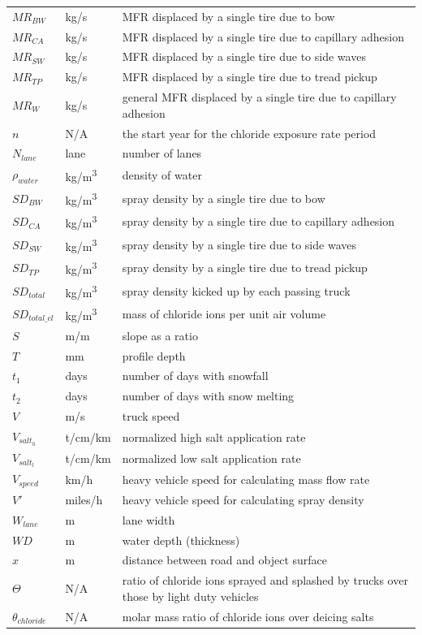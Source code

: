 \documentclass[12pt]{article}
\begin{document}
\begin{longtable*}{l l p{12cm}}
$\mathit{MR_{BW}}$ & \si{kg/s} & MFR displaced by a single tire due to bow\\
$\mathit{MR_{CA}}$ & \si{kg/s} & MFR displaced by a single tire due to capillary adhesion\\
$\mathit{MR_{SW}}$ & \si{kg/s} & MFR displaced by a single tire due to side waves\\
$\mathit{MR_{TP}}$ & \si{kg/s} & MFR displaced by a single tire due to tread pickup\\
$\mathit{MR_{W}}$ & \si{kg/s} & general MFR displaced by a single tire due to capillary adhesion\\
$n$ & N/A & the start year for the chloride exposure rate period \\
$N_{lane}$ & lane & number of lanes\\
$\rho_{water}$ & \si{kg/m^{3}} & density of water\\
$\mathit{SD_{BW}}$ & \si{kg/m^{3}} & spray density by a single tire due to bow\\
$\mathit{SD_{CA}}$ & \si{kg/m^{3}} & spray density by a single tire due to capillary adhesion\\
$\mathit{SD_{SW}}$ & \si{kg/m^{3}} & spray density by a single tire due to side waves\\
$\mathit{SD_{TP}}$ & \si{kg/m^{3}} & spray density by a single tire due to tread pickup\\
$\mathit{SD_{total}}$ & \si{kg/m^{3}} & spray density kicked up by each passing truck\\
$\mathit{SD_{total\_cl}}$ & \si{kg/m^3} & mass of chloride ions per unit air volume\\
$S$ & \si{m/m} & slope as a ratio\\
$T$ & \si{mm} & profile depth\\
$t_1$ & days & number of days with snowfall\\
$t_2$ & days & number of days with snow melting\\
$V$ & \si{m/s} & truck speed\\
$V_{salt_{h}}$ & \si{t/cm/km} & normalized high salt application rate\\
$V_{salt_{l}}$ & \si{t/cm/km} & normalized low salt application rate\\
$V_{speed}$ & \si{km/h} & heavy vehicle speed for calculating mass flow rate\\
$V'$ & \si{miles/h} & heavy vehicle speed for calculating spray density\\ %
$W_{lane}$ & \si{m} & lane width\\
$\mathit{WD}$ & \si{m} & water depth (thickness)\\
$x$ & \si{m} & distance between road and object surface\\
$\Theta$ & N/A & ratio of chloride ions sprayed and splashed by trucks over those by light duty vehicles\\
$\theta_{chloride}$ & N/A & molar mass ratio of chloride ions over deicing salts\\
\bottomrule
\end{longtable*}
\end{document}
